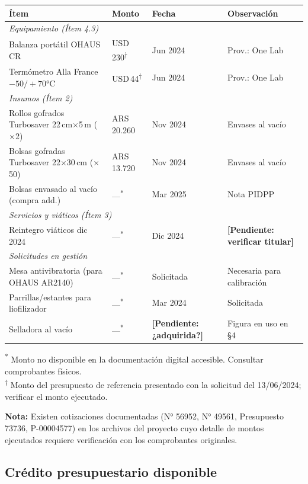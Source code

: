 \documentclass[12pt, a4paper]{article}
\newcommand{\pend}[1]{\textcolor{red!70!black}{\textbf{[Pendiente: #1]}}}
\begin{document}
\begin{longtable}{p{5cm}p{2.5cm}p{2cm}p{3.5cm}}
\toprule
\textbf{Ítem} & \textbf{Monto} & \textbf{Fecha} & \textbf{Observación} \\
\midrule
\multicolumn{4}{l}{\textit{Equipamiento (Ítem 4.3)}} \\
\midrule
Balanza portátil OHAUS CR & USD\,230\textsuperscript{†} & Jun 2024 & Prov.: One Lab \\
Termómetro Alla France $-50/+70$°C & USD\,44\textsuperscript{†} & Jun 2024 & Prov.: One Lab \\
\midrule
\multicolumn{4}{l}{\textit{Insumos (Ítem 2)}} \\
\midrule
Rollos gofrados Turbosaver 22\,cm$\times$5\,m ($\times$2) & ARS\,20.260 & Nov 2024 & Envases al vacío \\
Bolsas gofradas Turbosaver 22$\times$30\,cm ($\times$50) & ARS\,13.720 & Nov 2024 & Envases al vacío \\
Bolsas envasado al vacío (compra add.) & ---\textsuperscript{*} & Mar 2025 & Nota PIDPP \\
\midrule
\multicolumn{4}{l}{\textit{Servicios y viáticos (Ítem 3)}} \\
\midrule
Reintegro viáticos dic 2024 & ---\textsuperscript{*} & Dic 2024 & \pend{verificar titular} \\
\midrule
\multicolumn{4}{l}{\textit{Solicitudes en gestión}} \\
\midrule
Mesa antivibratoria (para OHAUS AR2140) & ---\textsuperscript{*} & Solicitada & Necesaria para calibración \\
Parrillas/estantes para liofilizador & ---\textsuperscript{*} & Mar 2024 & Solicitada \\
Selladora al vacío & ---\textsuperscript{*} & \pend{¿adquirida?} & Figura en uso en §4 \\
\bottomrule
\end{longtable}

{\footnotesize \textsuperscript{*} Monto no disponible en la documentación digital accesible. Consultar comprobantes físicos.\\
\textsuperscript{†} Monto del presupuesto de referencia presentado con la solicitud del 13/06/2024; verificar el monto ejecutado.}

\textbf{Nota:} Existen cotizaciones documentadas (N° 56952, N° 49561, Presupuesto 73736, P-00004577) en los archivos del proyecto cuyo detalle de montos ejecutados requiere verificación con los comprobantes originales.

\subsection{Crédito presupuestario disponible}
\end{document}
